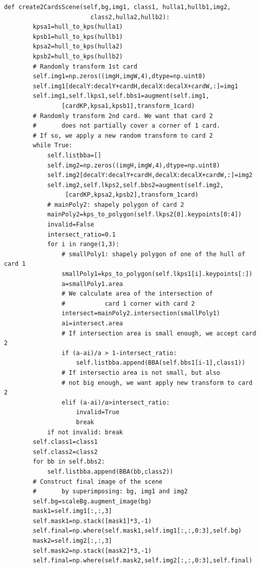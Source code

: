 \documentclass[12pt, а4paper]{article}
\begin{document}
\begin{verbatim}
def create2CardsScene(self,bg,img1, class1, hulla1,hullb1,img2,
						class2,hulla2,hullb2):
        kpsa1=hull_to_kps(hulla1)
        kpsb1=hull_to_kps(hullb1)
        kpsa2=hull_to_kps(hulla2)
        kpsb2=hull_to_kps(hullb2)        
        # Randomly transform 1st card
        self.img1=np.zeros((imgH,imgW,4),dtype=np.uint8)
        self.img1[decalY:decalY+cardH,decalX:decalX+cardW,:]=img1
        self.img1,self.lkps1,self.bbs1=augment(self.img1,
				[cardKP,kpsa1,kpsb1],transform_1card)
        # Randomly transform 2nd card. We want that card 2
        #		does not partially cover a corner of 1 card.
        # If so, we apply a new random transform to card 2
        while True:
            self.listbba=[]
            self.img2=np.zeros((imgH,imgW,4),dtype=np.uint8)
            self.img2[decalY:decalY+cardH,decalX:decalX+cardW,:]=img2
            self.img2,self.lkps2,self.bbs2=augment(self.img2,
				 [cardKP,kpsa2,kpsb2],transform_1card)
            # mainPoly2: shapely polygon of card 2
            mainPoly2=kps_to_polygon(self.lkps2[0].keypoints[0:4])
            invalid=False
            intersect_ratio=0.1
            for i in range(1,3):
                # smallPoly1: shapely polygon of one of the hull of card 1
                smallPoly1=kps_to_polygon(self.lkps1[i].keypoints[:])
                a=smallPoly1.area
                # We calculate area of the intersection of 
                #			card 1 corner with card 2
                intersect=mainPoly2.intersection(smallPoly1)
                ai=intersect.area
                # If intersection area is small enough, we accept card 2
                if (a-ai)/a > 1-intersect_ratio:
                    self.listbba.append(BBA(self.bbs1[i-1],class1))
                # If intersectio area is not small, but also 
                # not big enough, we want apply new transform to card 2
                elif (a-ai)/a>intersect_ratio:
                    invalid=True
                    break                    
            if not invalid: break            
        self.class1=class1
        self.class2=class2
        for bb in self.bbs2:
            self.listbba.append(BBA(bb,class2))
        # Construct final image of the scene 
        #		by superimposing: bg, img1 and img2
        self.bg=scaleBg.augment_image(bg)
        mask1=self.img1[:,:,3]
        self.mask1=np.stack([mask1]*3,-1)
        self.final=np.where(self.mask1,self.img1[:,:,0:3],self.bg)
        mask2=self.img2[:,:,3]
        self.mask2=np.stack([mask2]*3,-1)
        self.final=np.where(self.mask2,self.img2[:,:,0:3],self.final)
\end{verbatim}
\end{document}
